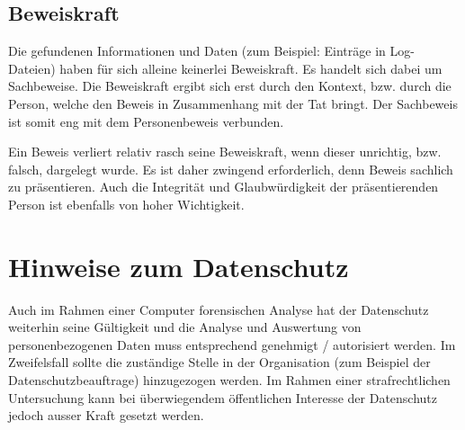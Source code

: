\subsection{Beweiskraft}
Die gefundenen Informationen und Daten (zum Beispiel: Einträge in Log-Dateien) haben für sich alleine keinerlei Beweiskraft. Es handelt sich dabei um Sachbeweise. Die Beweiskraft ergibt sich erst durch den Kontext, bzw. durch die Person, welche den Beweis in Zusammenhang mit der Tat bringt. Der Sachbeweis ist somit eng mit dem Personenbeweis verbunden.

Ein Beweis verliert relativ rasch seine Beweiskraft, wenn dieser unrichtig, bzw. falsch, dargelegt wurde. Es ist daher zwingend erforderlich, denn Beweis sachlich zu präsentieren. Auch die Integrität und Glaubwürdigkeit der präsentierenden Person ist ebenfalls von hoher Wichtigkeit.

\section{Hinweise zum Datenschutz}
Auch im Rahmen einer Computer forensischen Analyse hat der Datenschutz weiterhin seine Gültigkeit und die Analyse und Auswertung von personenbezogenen Daten muss entsprechend genehmigt / autorisiert werden. Im Zweifelsfall sollte die zuständige Stelle in der Organisation (zum Beispiel der Datenschutzbeauftrage) hinzugezogen werden. Im Rahmen einer strafrechtlichen Untersuchung kann bei überwiegendem öffentlichen Interesse der Datenschutz jedoch ausser Kraft gesetzt werden.